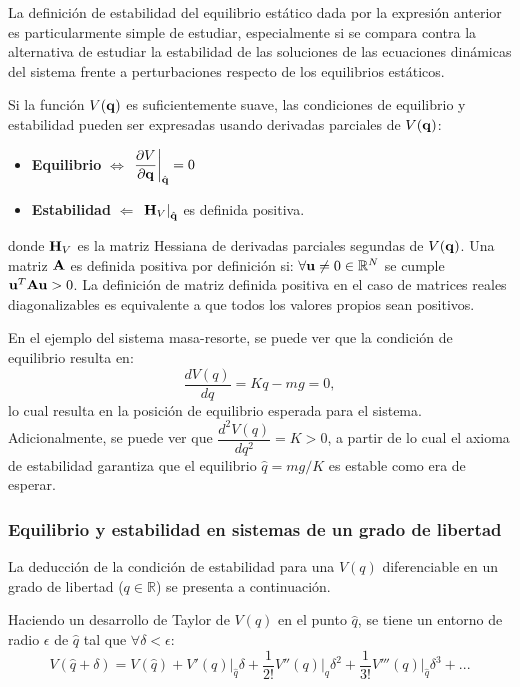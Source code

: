 
La definición de estabilidad del equilibrio estático dada por la expresión anterior es particularmente simple de estudiar, especialmente si se compara contra la alternativa de estudiar la estabilidad de las soluciones de las ecuaciones dinámicas del sistema frente a perturbaciones respecto de los equilibrios estáticos.

Si la función $V({\bf q})$ es suficientemente suave, las condiciones de equilibrio y estabilidad pueden ser expresadas usando derivadas parciales de $V({\bf q})$:
%
\begin{itemize}
	\item \textbf{Equilibrio} $\Leftrightarrow$ $\left. \dfrac{\partial V}{\partial {\bf q}}  \right|_{\hat{{\bf q}}} = 0$	
	\item \textbf{Estabilidad} $\Leftarrow$ $\left. \text{{\bf H}}_V  \right|_{\hat{{\bf q}}}$ es definida positiva.
\end{itemize}
%
donde ${\bf H}_V$ es la matriz Hessiana de derivadas parciales segundas de $V({\bf q})$. %
%
Una matriz ${\bf A}$ es definida positiva por definición si: $\forall {\bf u}\neq 0 \in \mathbb{R}^N$ se cumple ${\bf u}^T {\bf A} {\bf u} > 0$. La definición de matriz definida positiva en el caso de matrices reales diagonalizables es equivalente a que todos los valores propios sean positivos.

En el ejemplo del sistema masa-resorte, se puede ver que la condición de equilibrio resulta en:
%
\begin{equation}
	\dfrac{dV(q)}{dq}=Kq - mg = 0,
\end{equation}
%
lo cual resulta en la posición de equilibrio esperada para el sistema. Adicionalmente, se puede ver que $\dfrac{d^2V(q)}{dq^2}=K>0$, a partir de lo cual el axioma de estabilidad garantiza que el equilibrio $\hat{q}=mg/K$ es estable como era de esperar.

\subsubsection{Equilibrio y estabilidad en sistemas de un grado de libertad}

La deducción de la condición de estabilidad para una $V(q)$ diferenciable en un grado de libertad ($q\in\mathbb{R}$) se presenta a continuación.

Haciendo un desarrollo de Taylor de $V(q)$ en el punto $\hat{q}$, se tiene un entorno de radio $\epsilon$ de $\hat{q}$ tal que $\forall \delta < \epsilon$:
%
\begin{equation}\label{Estabilidad}
V(\hat{q}+\delta)=V(\hat{q})+\left.V'(q)\right|_{\hat{q}} \delta +\frac{1}{2!} \left.V''(q)\right|_{\hat{q}} \delta^2 +\frac{1}{3!} \left.V'''(q)\right|_{\hat{q}} \delta^3 +...
\end{equation}

